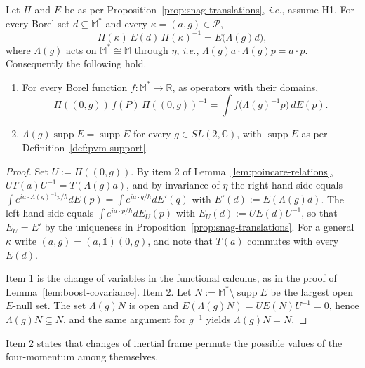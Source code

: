 \begin{lemma}\label{lem:poincare-covariance}
	Let $\Pi$ and $E$ be as per Proposition~\ref{prop:snag-translations}, \textit{i.e.}, assume H1. For every Borel set $d\subseteq\mathbb{M}^*$ and every $\kappa=(a,g)\in\mathcal{P}$,
	\begin{equation}\label{eq:covariance}
		\Pi(\kappa)\,E(d)\,\Pi(\kappa)^{-1}=E\big(\Lambda(g)d\big),
	\end{equation}
	where $\Lambda(g)$ acts on $\mathbb{M}^*\cong\mathbb{M}$ through $\eta$, \textit{i.e.}, $\Lambda(g)a\cdot\Lambda(g)p=a\cdot p$. Consequently the following hold.
	\begin{enumerate}
		\item For every Borel function $f:\mathbb{M}^*\to\mathbb{R}$, as operators with their domains,
		\begin{equation*}
			\Pi((0,g))\,f(P)\,\Pi((0,g))^{-1}=\int f\big(\Lambda(g)^{-1}p\big)\,dE(p).
		\end{equation*}
		\item $\Lambda(g)\operatorname{supp}E=\operatorname{supp}E$ for every $g\in SL(2,\mathbb{C})$, with $\operatorname{supp}E$ as per Definition~\ref{def:pvm-support}.
	\end{enumerate}
\end{lemma}

\begin{proof}
	Set $U:=\Pi((0,g))$. By item 2 of Lemma~\ref{lem:poincare-relations}, $UT(a)U^{-1}=T(\Lambda(g)a)$, and by invariance of $\eta$ the right-hand side equals $\int e^{ia\cdot\Lambda(g)^{-1}p/\hbar}dE(p)=\int e^{ia\cdot q/\hbar}dE'(q)$ with $E'(d):=E(\Lambda(g)d)$. The left-hand side equals $\int e^{ia\cdot p/\hbar}dE_U(p)$ with $E_U(d):=UE(d)U^{-1}$, so that $E_U=E'$ by the uniqueness in Proposition~\ref{prop:snag-translations}. For a general $\kappa$ write $(a,g)=(a,\mathbb{1})(0,g)$, and note that $T(a)$ commutes with every $E(d)$.
	
	Item 1 is the change of variables in the functional calculus, as in the proof of Lemma~\ref{lem:boost-covariance}. Item 2. Let $N:=\mathbb{M}^*\setminus\operatorname{supp}E$ be the largest open $E$-null set. The set $\Lambda(g)N$ is open and $E(\Lambda(g)N)=UE(N)U^{-1}=0$, hence $\Lambda(g)N\subseteq N$, and the same argument for $g^{-1}$ yields $\Lambda(g)N=N$.
\end{proof}

\noindent Item 2 states that changes of inertial frame permute the possible values of the four-momentum among themselves.

